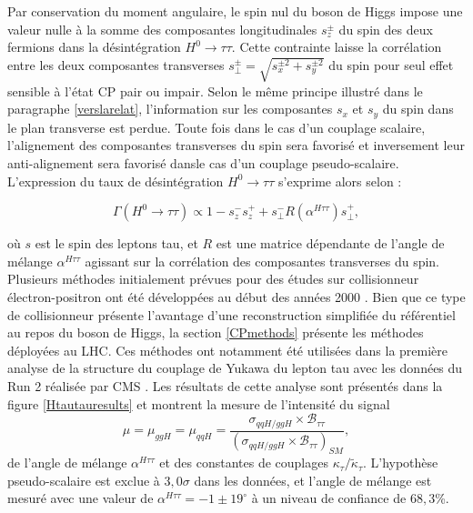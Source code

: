    Par conservation du moment angulaire, le spin nul du boson de Higgs impose une valeur nulle à la somme des composantes longitudinales $s_{z}^{\pm}$ du spin des deux fermions dans la désintégration $H^0\rightarrow\tau\tau$. Cette contrainte laisse la corrélation entre les deux composantes transverses $s_{\perp}^{\pm}=\sqrt{s_{x}^{\pm2}+s_{y}^{\pm2}}$ du spin pour seul effet sensible à l'état CP pair ou impair. Selon le même principe illustré dans le paragraphe \ref{verslarelat}, l'information sur les composantes $s_x$ et $s_y$ du spin dans le plan transverse est perdue. Toute fois dans le cas d'un couplage scalaire, l'alignement des composantes transverses du spin sera favorisé et inversement leur anti-alignement sera favorisé dansle cas d'un couplage pseudo-scalaire. L'expression du taux de désintégration $H^0\rightarrow\tau\tau$ s'exprime alors selon :

    \begin{equation}
    \Gamma(H^0\rightarrow\tau\tau)\propto1-s_{z}^-s_{z}^++s_{\perp}^-R(\alpha^{H\tau\tau})s_{\perp}^+,
    \end{equation}

    où $s$ est le spin des leptons tau, et $R$ est une matrice dépendante de l'angle de mélange $\alpha^{H\tau\tau}$ agissant sur la corrélation des composantes transverses du spin. Plusieurs méthodes initialement prévues pour des études sur collisionneur électron-positron ont été développées au début des années 2000 \cite{Desch_2003,Desch_2004}. Bien que ce type de collisionneur présente l'avantage d'une reconstruction simplifiée du référentiel au repos du boson de Higgs, la section \ref{CPmethods} présente les méthodes déployées au LHC. Ces méthodes ont notamment été utilisées dans la première analyse de la structure du couplage de Yukawa du lepton tau avec les données du Run 2 réalisée par CMS \cite{Htautau}. Les résultats de cette analyse sont présentés dans la figure \ref{Htautauresults} et montrent la mesure de l'intensité du signal $$\mu=\mu_{ggH}=\mu_{qqH}=\frac{\sigma_{qqH/ggH}\times\mathcal{B}_{\tau\tau}}{(\sigma_{qqH/ggH}\times\mathcal{B}_{\tau\tau})_{SM}},$$ de l'angle de mélange $\alpha^{H\tau\tau}$ et des constantes de couplages $\kappa_{\tau}/\tilde{\kappa}_{\tau}$. L'hypothèse pseudo-scalaire est exclue à $3,0\sigma$ dans les données, et l'angle de mélange est mesuré avec une valeur de $\alpha^{H\tau\tau}=-1\pm19^\circ$ à un niveau de confiance de $68,3$\%. \\

